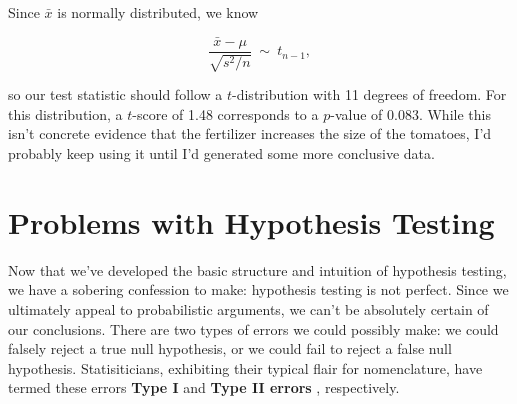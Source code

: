 Since $\bar{x}$ is normally distributed, we know

\begin{equation*}

\frac{\bar{x}-\mu}{\sqrt{s^2/n}} \ \sim \  t_{n-1},

\end{equation*}

so our test statistic should follow a $t$-distribution with 11 degrees of freedom.  For this distribution, a $t$-score of 1.48 corresponds to a $p$-value of 0.083.  While this isn't concrete evidence that the fertilizer increases the size of the tomatoes, I'd probably keep using it until I'd generated some more conclusive data.







\section{Problems with Hypothesis Testing} \label{sec: Hypothesis Probs}





Now that we've developed the basic structure and intuition of hypothesis testing, we have a sobering confession to make: hypothesis testing is not perfect. Since we ultimately appeal to probabilistic arguments, we can't be absolutely certain of our conclusions. There are two types of errors we could possibly make: we could falsely reject a true null hypothesis, or we could fail to reject a false null hypothesis. Statisiticians, exhibiting their typical flair for nomenclature, have termed these errors \textbf{Type I} and \textbf{Type II errors} , respectively.



